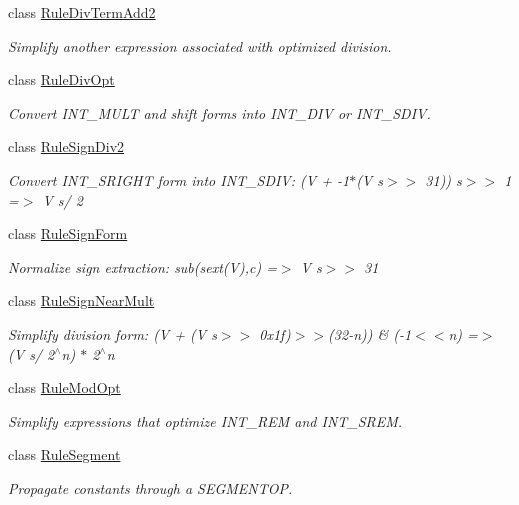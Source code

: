 \begin{DoxyCompactItemize}
class \mbox{\hyperlink{class_rule_div_term_add2}{Rule\+Div\+Term\+Add2}}
\begin{DoxyCompactList}\small\item\em Simplify another expression associated with optimized division. \end{DoxyCompactList}\item 
class \mbox{\hyperlink{class_rule_div_opt}{Rule\+Div\+Opt}}
\begin{DoxyCompactList}\small\item\em Convert I\+N\+T\+\_\+\+M\+U\+LT and shift forms into I\+N\+T\+\_\+\+D\+IV or I\+N\+T\+\_\+\+S\+D\+IV. \end{DoxyCompactList}\item 
class \mbox{\hyperlink{class_rule_sign_div2}{Rule\+Sign\+Div2}}
\begin{DoxyCompactList}\small\item\em Convert I\+N\+T\+\_\+\+S\+R\+I\+G\+HT form into I\+N\+T\+\_\+\+S\+D\+IV\+: {\ttfamily (V + -\/1$\ast$(V s$>$$>$ 31)) s$>$$>$ 1 =$>$ V s/ 2} \end{DoxyCompactList}\item 
class \mbox{\hyperlink{class_rule_sign_form}{Rule\+Sign\+Form}}
\begin{DoxyCompactList}\small\item\em Normalize sign extraction\+: {\ttfamily sub(sext(\+V),c) =$>$ V s$>$$>$ 31} \end{DoxyCompactList}\item 
class \mbox{\hyperlink{class_rule_sign_near_mult}{Rule\+Sign\+Near\+Mult}}
\begin{DoxyCompactList}\small\item\em Simplify division form\+: {\ttfamily (V + (V s$>$$>$ 0x1f)$>$$>$(32-\/n)) \& (-\/1$<$$<$n) =$>$ (V s/ 2$^\wedge$n) $\ast$ 2$^\wedge$n} \end{DoxyCompactList}\item 
class \mbox{\hyperlink{class_rule_mod_opt}{Rule\+Mod\+Opt}}
\begin{DoxyCompactList}\small\item\em Simplify expressions that optimize I\+N\+T\+\_\+\+R\+EM and I\+N\+T\+\_\+\+S\+R\+EM. \end{DoxyCompactList}\item 
class \mbox{\hyperlink{class_rule_segment}{Rule\+Segment}}
\begin{DoxyCompactList}\small\item\em Propagate constants through a S\+E\+G\+M\+E\+N\+T\+OP. \end{DoxyCompactList}\item 

\end{DoxyCompactItemize}
